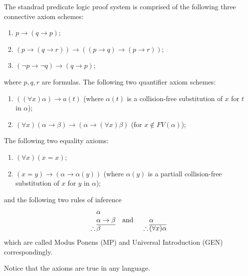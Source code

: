 \documentclass[11pt,a4paper]{article}
\renewcommand{\implies}{\rightarrow}
\begin{document}
\begin{definition}
  The standrad predicate logic proof system is comprised of the
  following three connective axiom schemes:
  \begin{enumerate}
    \item[(1)] $p\to (q\to p)$;
    \item[(2)] $(p\to (q\to r))\to ((p\to q)\to (p\to r))$;
    \item[(3)] $(\neg p\to \neg q)\to (q\to p)$;
  \end{enumerate}
  where $p,q,r$ are formulas.
  The following two quantifier axiom schemes:
  \begin{enumerate}
    \item[(4)] $((\forall x) \alpha) \implies a(t)$ (where $\alpha(t)$
      is a collision-free substitution of $x$ for $t$ in $\alpha$);
    \item[(5)] $(\forall x)(\alpha \implies \beta) \implies
      (\alpha \implies (\forall x)\beta)$ (for $x \notin FV(\alpha)$);
  \end{enumerate}
  The following two equality axioms:
  \begin{enumerate}
    \item[(6)] $(\forall x)(x = x)$;
    \item[(7)] $(x = y) \implies (\alpha \implies \alpha(y))$ (where
      $\alpha(y)$ is a partiall collision-free substitution of $x$
      for $y$ in $\alpha$);
  \end{enumerate}
  and the following two rules of inference
  \[
    \begin{array}{c@{\,}l@{}}
                & \alpha         \\
                & \alpha \to \beta   \\ \cline{2-2}
    \therefore  & \beta
    \end{array} \tand
    \begin{array}{c@{\,}l@{}}
                & \\
                & \alpha         \\ \cline{2-2}
    \therefore  & (\forall x)\alpha
    \end{array}
  \]
  which are called Modus Ponens (MP) and Universal Introduction (GEN)
  correspondingly.
\end{definition}

\begin{remark}
  Notice that the axioms are true in any language.
\end{remark}
\end{document}

